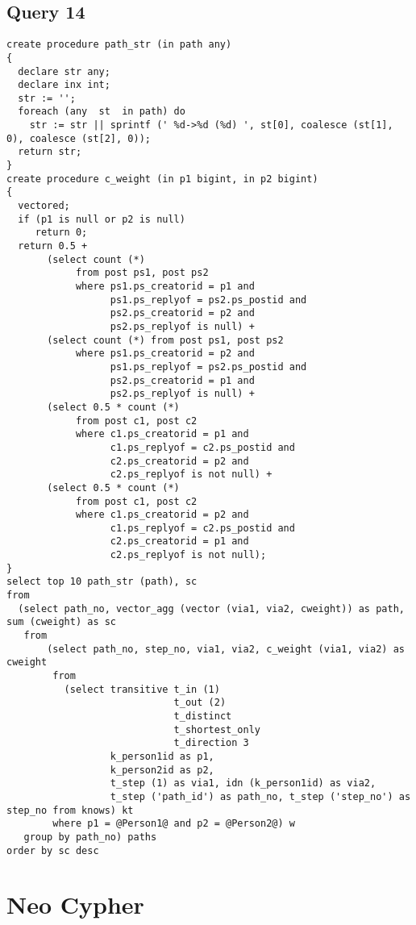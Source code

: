 \subsection{Query 14}
\begin{verbatim}
create procedure path_str (in path any)
{
  declare str any;
  declare inx int;
  str := '';
  foreach (any  st  in path) do
    str := str || sprintf (' %d->%d (%d) ', st[0], coalesce (st[1], 0), coalesce (st[2], 0));
  return str;
} 
create procedure c_weight (in p1 bigint, in p2 bigint)
{
  vectored;
  if (p1 is null or p2 is null)
     return 0;
  return 0.5 +
       (select count (*) 
            from post ps1, post ps2
            where ps1.ps_creatorid = p1 and 
                  ps1.ps_replyof = ps2.ps_postid and
                  ps2.ps_creatorid = p2 and 
                  ps2.ps_replyof is null) +
       (select count (*) from post ps1, post ps2
            where ps1.ps_creatorid = p2 and 
                  ps1.ps_replyof = ps2.ps_postid and
                  ps2.ps_creatorid = p1 and 
                  ps2.ps_replyof is null) +
       (select 0.5 * count (*) 
            from post c1, post c2
            where c1.ps_creatorid = p1 and
                  c1.ps_replyof = c2.ps_postid and
                  c2.ps_creatorid = p2 and 
                  c2.ps_replyof is not null) +
       (select 0.5 * count (*) 
            from post c1, post c2
            where c1.ps_creatorid = p2 and 
                  c1.ps_replyof = c2.ps_postid and 
                  c2.ps_creatorid = p1 and 
                  c2.ps_replyof is not null);
} 
select top 10 path_str (path), sc
from
  (select path_no, vector_agg (vector (via1, via2, cweight)) as path, sum (cweight) as sc
   from
       (select path_no, step_no, via1, via2, c_weight (via1, via2) as cweight
        from
          (select transitive t_in (1) 
                             t_out (2) 
                             t_distinct 
                             t_shortest_only 
                             t_direction 3
                  k_person1id as p1, 
                  k_person2id as p2, 
                  t_step (1) as via1, idn (k_person1id) as via2,
                  t_step ('path_id') as path_no, t_step ('step_no') as step_no from knows) kt
        where p1 = @Person1@ and p2 = @Person2@) w
   group by path_no) paths
order by sc desc
\end{verbatim}

\section{Neo Cypher}

